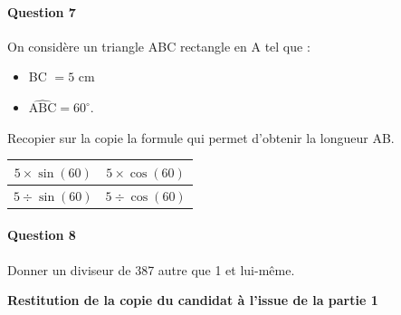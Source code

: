 \documentclass{dnbqcm}
\begin{document}
    \vspace{8pt}
    \paragraph{Question 7}
    On considère un triangle ABC rectangle en A tel que :
    \begin{itemize}
    \item BC $= 5$ cm
    \item $\widehat{\text{ABC}} = 60^\circ$.
    \end{itemize}
    Recopier sur la copie la formule qui permet d'obtenir la longueur AB.

    \vspace{6pt}
    \begin{minipage}{0.45\textwidth}
    \begin{center}
    \begin{tabular}{|c|c|}
    \hline
    $5 \times \sin(60)$ & $5 \times \cos(60)$ \\
    \hline
    $5 \div \sin(60)$ & $5 \div \cos(60)$ \\
    \hline
    \end{tabular}
    \end{center}
    \end{minipage}
    \hfill
    \begin{minipage}{0.50\textwidth}
    \begin{center}
    \vspace{4pt}

    \end{center}
    \end{minipage}

    \vspace{10pt}
    \paragraph{Question 8}
    Donner un diviseur de 387 autre que 1 et lui-même.

    \vspace{20pt}
    \begin{center}
    \textbf{Restitution de la copie du candidat à l'issue de la partie 1}
    \end{center}
\end{document}
